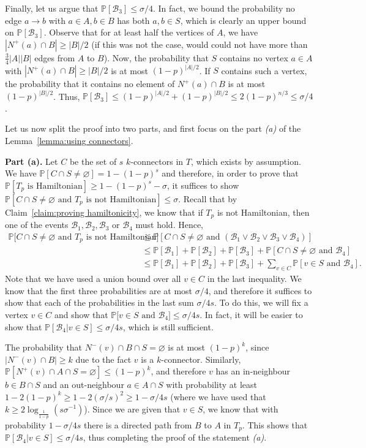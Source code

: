 \documentclass[a4paper,11pt]{article}
\makeatletter
\renewenvironment{proof}[1][\proofname] {\par\pushQED{\qed}\normalfont\topsep6\p@\@plus6\p@\relax\trivlist\item[\hskip\labelsep\textit{#1}\@addpunct{.}]\ignorespaces}{\popQED\endtrivlist\@endpefalse}
\theoremstyle{definition}
\def\Pb{\mathbb{P}}
\def\cB{\mathcal{B}}
\makeatother
\begin{document}
\begin{proof}[Proof of Lemma~\ref{lemma:using connectors}.]
Finally, let us argue that $\Pb[\cB_3]\leq \sigma/4$. In fact, we bound the probability no edge $a\to b$ with $a\in A, b\in B$ has both $a, b\in S$, which is clearly an upper bound on $\Pb[\cB_3]$. Observe that for at least half the vertices of $A$, we have $|N^+(a)\cap B|\geq |B|/2$ (if this was not the case, would could not have more than $\frac{3}{4}|A||B|$ edges from $A$ to $B$). Now, the probability that $S$ contains no vertex $a\in A$ with $|N^+(a)\cap B|\geq |B|/2$ is at most $(1-p)^{|A|/2}$. If $S$ contains such a vertex, the probability that it contains no element of $N^+(a)\cap B$ is at most $(1-p)^{|B|/2}$. Thus, $\Pb[\cB_3]\leq (1-p)^{|A|/2}+(1-p)^{|B|/2}\leq 2(1-p)^{n/3}\leq \sigma/4$.

Let us now split the proof into two parts, and first focus on the part \textit{(a)} of the Lemma~\ref{lemma:using connectors}.
\medskip

\noindent
\textbf{Part {(a)}.}
Let $C$ be the set of $s$ $k$-connectors in $T$, which exists by assumption. We have $\Pb[C\cap S\neq \varnothing]=1-(1-p)^s$ and therefore, in order to prove that $\Pb[T_p\text{ is Hamiltonian}]\geq 1-(1-p)^s-\sigma$, it suffices to show $\Pb[C\cap S\neq \varnothing\text{ and }T_p\text{ is not Hamiltonian}]\leq \sigma$. Recall that by Claim~\ref{claim:proving hamiltonicity}, we know that if $T_p$ is not Hamiltonian, then one of the events $\cB_1, \cB_2, \cB_3$ or $\cB_4$ must hold. Hence,
\begin{align*}
\Pb\big[C\cap S\neq \varnothing\text{ and }T_p\text{ is not Hamiltonian}\big]
&\leq \Pb[C\cap S\neq \varnothing\text{ and }(\cB_1\vee \cB_2\vee \cB_3\vee \cB_4)]\\
&\leq \Pb[\cB_1]+ \Pb[\cB_2]+ \Pb[\cB_3]+ \Pb[C\cap S\neq \varnothing\text{ and }\cB_4]\\
&\leq \Pb[\cB_1]+ \Pb[\cB_2]+ \Pb[\cB_3]+ \sum_{v\in C} \Pb[v\in S\text{ and }\cB_4 ].
\end{align*}
Note that we have used a union bound over all $v\in C$ in the last inequality. We know that the first three probabilities are at most $\sigma/4$, and therefore it suffices to show that each of the probabilities in the last sum $\sigma/4s$. To do this, we will fix a vertex $v\in C$ and show that $\Pb\big[v\in S\text{ and } \cB_4\big]\leq \sigma/4s$. In fact, it will be easier to show that $\Pb[\cB_4|v\in S]\leq \sigma/4s$, which is still sufficient. 

The probability that $N^-(v)\cap B\cap S=\varnothing$ is at most $(1-p)^{k}$, since $|N^-(v)\cap B|\geq k$ due to the fact $v$ is a $k$-connector. Similarly, $\Pb[N^+(v)\cap A\cap S=\varnothing]\leq (1-p)^k$, and therefore $v$ has an in-neighbour $b\in B\cap S$ and an out-neighbour $a\in A\cap S$ with probability at least $1-2(1-p)^k\geq 1-2(\sigma/s)^2\geq 1-\sigma/4 s$ (where we have used that $k\geq 2\log_{\frac{1}{1-p}}(s\sigma^{-1})$). Since we are given that $v\in S$, we know that with probability $1-\sigma/4s$ there is a directed path from $B$ to $A$ in $T_p$. This shows that $\Pb[\cB_4|v\in S]\leq \sigma/4s$, thus completing the proof of the statement \textit{(a)}.
\medskip


\end{proof}
\end{document}
